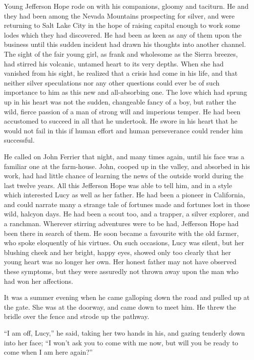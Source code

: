 \documentclass[12pt,english]{book}
\begin{document}
Young Jefferson Hope rode on with his companions, gloomy and taciturn.
He and they had been among the Nevada Mountains prospecting for silver,
and were returning to Salt Lake City in the hope of raising capital
enough to work some lodes which they had discovered. He had been as
keen as any of them upon the business until this sudden incident had
drawn his thoughts into another channel. The sight of the fair young
girl, as frank and wholesome as the Sierra breezes, had stirred his
volcanic, untamed heart to its very depths. When she had vanished
from his sight, he realized that a crisis had come in his life, and
that neither silver speculations nor any other questions could ever
be of such importance to him as this new and all-absorbing one. The
love which had sprung up in his heart was not the sudden, changeable
fancy of a boy, but rather the wild, fierce passion of a man of strong
will and imperious temper. He had been accustomed to succeed in all
that he undertook. He swore in his heart that he would not fail in
this if human effort and human perseverance could render him successful.

He called on John Ferrier that night, and many times again, until
his face was a familiar one at the farm-house. John, cooped up in
the valley, and absorbed in his work, had had little chance of learning
the news of the outside world during the last twelve years. All this
Jefferson Hope was able to tell him, and in a style which interested
Lucy as well as her father. He had been a pioneer in California, and
could narrate many a strange tale of fortunes made and fortunes lost
in those wild, halcyon days. He had been a scout too, and a trapper,
a silver explorer, and a ranchman. Wherever stirring adventures were
to be had, Jefferson Hope had been there in search of them. He soon
became a favourite with the old farmer, who spoke eloquently of his
virtues. On such occasions, Lucy was silent, but her blushing cheek
and her bright, happy eyes, showed only too clearly that her young
heart was no longer her own. Her honest father may not have observed
these symptoms, but they were assuredly not thrown away upon the man
who had won her affections.

It was a summer evening when he came galloping down the road and pulled
up at the gate. She was at the doorway, and came down to meet him.
He threw the bridle over the fence and strode up the pathway.

{}``I am off, Lucy,'' he said, taking her two hands in his, and
gazing tenderly down into her face; {}``I won't ask you to come with
me now, but will you be ready to come when I am here again?''
\end{document}
